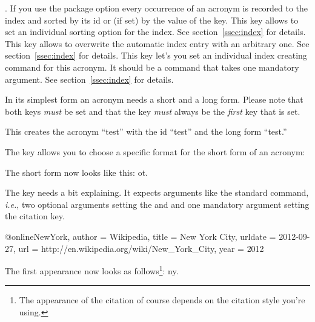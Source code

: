 \documentclass[load-preamble+]{cnltx-doc}
\newcommand*\latin{\textit}
\begin{document}
\begin{options}
    .
    If you use the package option  every occurrence of an
    acronym is recorded to the index and sorted by its \acs{id} or (if set) by
    the value of the  key.  This key allows to set an individual
    sorting option for the index.  See section~\vref{ssec:index} for details.
    This key allows to overwrite the automatic index entry with an arbitrary
    one.  See section~\vref{ssec:index} for details.
    This key let's you set an individual index creating command for this
    acronym.  It should be a command that takes one mandatory argument.  See
    section~\vref{ssec:index} for details. 
\end{options}

In its simplest form an acronym needs a short and a long form.  Please note
that both keys \emph{must} be set and that the  key \emph{must}
always be the \emph{first} key that is set.
\begin{sourcecode}
\end{sourcecode}
This creates the acronym ``\acs{test}'' with the \acs{id} ``test'' and the
long form ``\acl{test}.''

The  key allows you to choose a specific format for the short
form of an acronym:
\begin{sourcecode}
\end{sourcecode}
The short form now looks like this: \acs{ot}.

The  key needs a bit explaining.  It expects arguments like the
standard  command, \latin{i.e.}, two optional arguments setting the
 and  and one mandatory argument setting the
citation key.
\begin{sourcecode}
\end{sourcecode}

\begin{sourcecode}[sourcecode-options={style=cnltx-bibtex}]
  @online{NewYork,
    author  = {Wikipedia},
    title   = {New York City},
    urldate = {2012-09-27},
    url     = {http://en.wikipedia.org/wiki/New_York_City},
    year    = {2012}
  }
\end{sourcecode}
The first appearance now looks as follows\footnote{The appearance of the
  citation of course depends on the citation style you're using.}: \acf{ny}.
\end{document}
